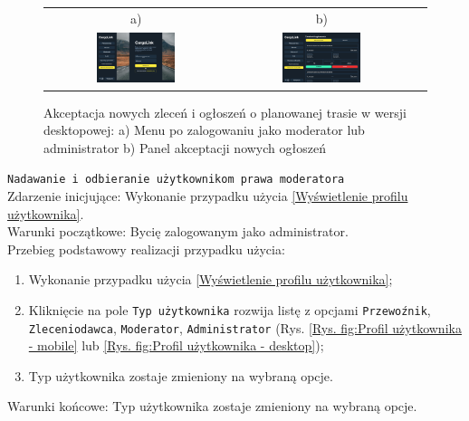  \begin{figure}[H]
  \centering
   \begin{tabular}{@{}ccc@{}}
   a) & b)\\
   \includegraphics[width=0.45\textwidth]{rozdzial1/menu_moderator_d.jpg} &
   \includegraphics[width=0.45\textwidth]{rozdzial1/zatwierdz_d.jpg}
   \end{tabular}
  \caption{Akceptacja nowych zleceń i ogłoszeń o planowanej trasie w wersji desktopowej: a) Menu po zalogowaniu jako moderator lub administrator b) Panel akceptacji nowych ogłoszeń}
  \label{Akceptacja ogłoszenia - destkop - ab}
 \end{figure}

 \texttt{Nadawanie i odbieranie użytkownikom prawa moderatora} \\
 Zdarzenie inicjujące: Wykonanie przypadku użycia \ref{Wyświetlenie profilu użytkownika}. \\
 Warunki początkowe: Bycię zalogowanym jako administrator. \\
 Przebieg podstawowy realizacji przypadku użycia: \\
 \begin{enumerate}
    \item Wykonanie przypadku użycia \ref{Wyświetlenie profilu użytkownika};
    \item Kliknięcie na pole \texttt{Typ użytkownika} rozwija listę z opcjami \texttt{Przewoźnik}, \texttt{Zleceniodawca}, \texttt{Moderator}, \texttt{Administrator} (Rys. \ref{Rys. fig:Profil użytkownika - mobile} lub \ref{Rys. fig:Profil użytkownika - desktop});
    \item Typ użytkownika zostaje zmieniony na wybraną opcje.
 \end{enumerate}
 Warunki końcowe: Typ użytkownika zostaje zmieniony na wybraną opcje. \\

